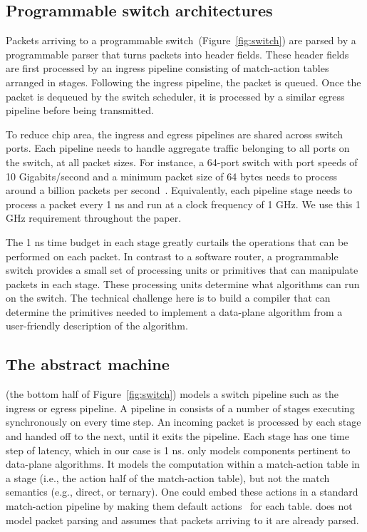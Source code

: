 \subsection{Programmable switch architectures}
Packets arriving to a programmable switch~(Figure~\ref{fig:switch}) are parsed
by a programmable parser that turns packets into header fields. These header
fields are first processed by an ingress pipeline consisting of match-action
tables arranged in stages.  Following the ingress pipeline, the packet is
queued. Once the packet is dequeued by the switch scheduler, it is processed by
a similar egress pipeline before being transmitted.

To reduce chip area, the ingress and egress pipelines are shared across switch
ports.  Each pipeline needs to handle aggregate traffic belonging to all ports
on the switch, at all packet sizes. For instance, a 64-port switch with port
speeds of 10 Gigabits/second and a minimum packet size of 64 bytes needs to
process around a billion packets per second~\cite{rmt}.  Equivalently, each
pipeline stage needs to process a packet every 1 ns and run at a clock
frequency of 1 GHz. We use this 1 GHz requirement throughout the paper.

The 1 ns time budget in each stage greatly curtails the operations that can be
performed on each packet. In contrast to a software router, a programmable
switch provides a small set of processing units or primitives that can
manipulate packets in each stage. These processing units determine what
algorithms can run on the switch. The technical challenge here is to build a
compiler that can determine the primitives needed to implement a data-plane
algorithm from a user-friendly description of the algorithm.

\subsection{The \absmachine abstract machine}

\absmachine (the bottom half of Figure~\ref{fig:switch}) models a switch
pipeline such as the ingress or egress pipeline. A pipeline in \absmachine
consists of a number of stages executing synchronously on every time step. An
incoming packet is processed by each stage and handed off to the next, until it
exits the pipeline. Each stage has one time step of latency, which in our case
is 1 ns. \absmachine only models components pertinent to data-plane algorithms.
It models the computation within a match-action table in a stage (i.e., the
action half of the match-action table), but not the match semantics (e.g.,
direct, or ternary). One could embed these actions in a standard match-action
pipeline by making them default actions~\cite{p4spec} for each table.
\absmachine does not model packet parsing and assumes that packets arriving to
it are already parsed.

